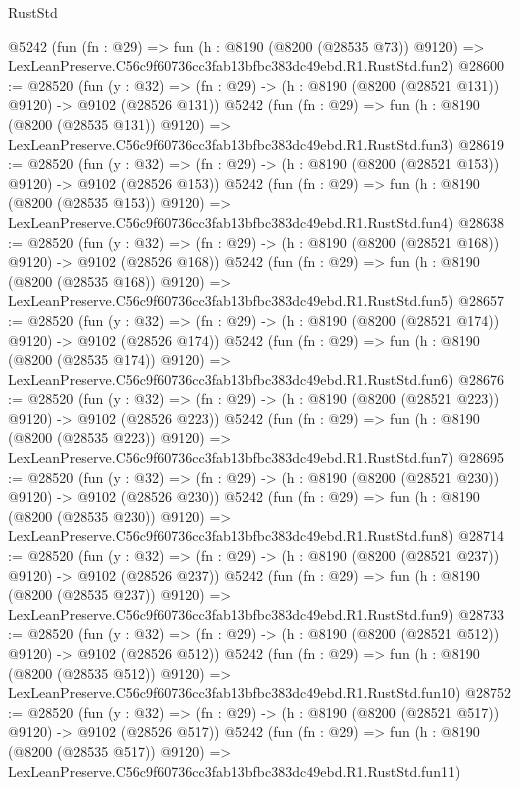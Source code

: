 \begin{lexlean}{RustStd}
\begin{coremodule}
    @5242
    (fun (fn : @29) =>
    fun (h : @8190 (@8200 (@28535 @73)) @9120) =>
    LexLeanPreserve.C56c9f60736cc3fab13bfbc383dc49ebd.R1.RustStd.fun2)
@28600 := @28520
    (fun (y : @32) => (fn : @29) -> (h : @8190 (@8200 (@28521 @131)) @9120) -> @9102 (@28526 @131))
    @5242
    (fun (fn : @29) =>
    fun (h : @8190 (@8200 (@28535 @131)) @9120) =>
    LexLeanPreserve.C56c9f60736cc3fab13bfbc383dc49ebd.R1.RustStd.fun3)
@28619 := @28520
    (fun (y : @32) => (fn : @29) -> (h : @8190 (@8200 (@28521 @153)) @9120) -> @9102 (@28526 @153))
    @5242
    (fun (fn : @29) =>
    fun (h : @8190 (@8200 (@28535 @153)) @9120) =>
    LexLeanPreserve.C56c9f60736cc3fab13bfbc383dc49ebd.R1.RustStd.fun4)
@28638 := @28520
    (fun (y : @32) => (fn : @29) -> (h : @8190 (@8200 (@28521 @168)) @9120) -> @9102 (@28526 @168))
    @5242
    (fun (fn : @29) =>
    fun (h : @8190 (@8200 (@28535 @168)) @9120) =>
    LexLeanPreserve.C56c9f60736cc3fab13bfbc383dc49ebd.R1.RustStd.fun5)
@28657 := @28520
    (fun (y : @32) => (fn : @29) -> (h : @8190 (@8200 (@28521 @174)) @9120) -> @9102 (@28526 @174))
    @5242
    (fun (fn : @29) =>
    fun (h : @8190 (@8200 (@28535 @174)) @9120) =>
    LexLeanPreserve.C56c9f60736cc3fab13bfbc383dc49ebd.R1.RustStd.fun6)
@28676 := @28520
    (fun (y : @32) => (fn : @29) -> (h : @8190 (@8200 (@28521 @223)) @9120) -> @9102 (@28526 @223))
    @5242
    (fun (fn : @29) =>
    fun (h : @8190 (@8200 (@28535 @223)) @9120) =>
    LexLeanPreserve.C56c9f60736cc3fab13bfbc383dc49ebd.R1.RustStd.fun7)
@28695 := @28520
    (fun (y : @32) => (fn : @29) -> (h : @8190 (@8200 (@28521 @230)) @9120) -> @9102 (@28526 @230))
    @5242
    (fun (fn : @29) =>
    fun (h : @8190 (@8200 (@28535 @230)) @9120) =>
    LexLeanPreserve.C56c9f60736cc3fab13bfbc383dc49ebd.R1.RustStd.fun8)
@28714 := @28520
    (fun (y : @32) => (fn : @29) -> (h : @8190 (@8200 (@28521 @237)) @9120) -> @9102 (@28526 @237))
    @5242
    (fun (fn : @29) =>
    fun (h : @8190 (@8200 (@28535 @237)) @9120) =>
    LexLeanPreserve.C56c9f60736cc3fab13bfbc383dc49ebd.R1.RustStd.fun9)
@28733 := @28520
    (fun (y : @32) => (fn : @29) -> (h : @8190 (@8200 (@28521 @512)) @9120) -> @9102 (@28526 @512))
    @5242
    (fun (fn : @29) =>
    fun (h : @8190 (@8200 (@28535 @512)) @9120) =>
    LexLeanPreserve.C56c9f60736cc3fab13bfbc383dc49ebd.R1.RustStd.fun10)
@28752 := @28520
    (fun (y : @32) => (fn : @29) -> (h : @8190 (@8200 (@28521 @517)) @9120) -> @9102 (@28526 @517))
    @5242
    (fun (fn : @29) =>
    fun (h : @8190 (@8200 (@28535 @517)) @9120) =>
    LexLeanPreserve.C56c9f60736cc3fab13bfbc383dc49ebd.R1.RustStd.fun11)

\end{coremodule}
\end{lexlean}

